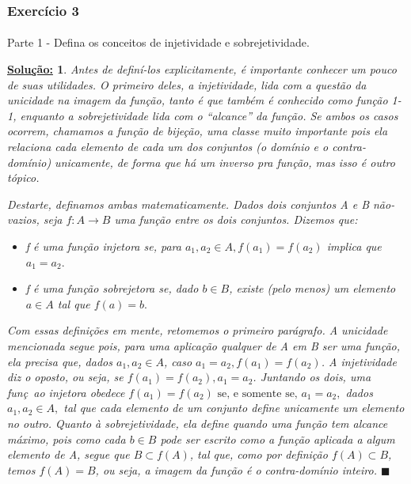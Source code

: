 \documentclass{article}
\newtheorem*{sol*}{\underline{Solu\c c\~ao:}}
\renewcommand\qedsymbol{$\blacksquare$}
\begin{document}
\subsubsection{Exerc\'icio 3}
\paragraph{}Parte 1  - Defina os conceitos de injetividade e sobrejetividade.
\begin{sol*}
	Antes de defin\'i-los explicitamente, \'e importante conhecer um pouco de suas utilidades. O primeiro deles, a injetividade, lida com a quest\~ao da unicidade na imagem da fun\c c\~ao, tanto \'e que tamb\'em \'e conhecido como fun\c c\~ao 1-1, enquanto a sobrejetividade lida com o ``alcance'' da fun\c c\~ao. Se ambos os casos ocorrem, chamamos a fun\c c\~ao de bije\c c\~ao, uma classe muito importante pois ela relaciona cada elemento de cada um dos conjuntos (o dom\'inio e o contra-dom\'inio) unicamente, de forma que h\'a um inverso pra fun\c c\~ao, mas isso \'e outro t\'opico.

	Destarte, definamos ambas matematicamente. Dados dois conjuntos A e B n\~ao-vazios, seja $f:A\rightarrow{B}$ uma fun\c c\~ao entre os dois conjuntos. Dizemos que:
	\begin{itemize}
		\item[a)] f \'e uma fun\c c\~ao injetora se, para $a_1, a_2\in{A}, f(a_1) = f(a_2)$ implica que $a_1 =  a_2.$
		\item[b)] f \'e uma fun\c c\~ao sobrejetora se, dado $b\in{B}$, existe (pelo menos) um elemento $a\in{A}$ tal que $f(a) = b.$
	\end{itemize}

	Com essas defini\c c\~oes em mente, retomemos o primeiro par\'agrafo. A unicidade mencionada segue pois, para uma aplica\c c\~ao qualquer de A em B ser uma fun\c c\~ao, ela precisa que, dados $a_1, a_2\in{A}$, caso $a_1 = a_2, f(a_1) = f(a_2)$. A injetividade diz o oposto, ou seja, se $f(a_1) = f(a_2), a_1 = a_2$. Juntando os dois, uma fun\c c~ao injetora obedece $f(a_1) = f(a_2) \text{ se, e somente se, } a_1 = a_2,$ dados $a_1, a_2\in{A},$ tal que cada elemento de um conjunto define unicamente um elemento no outro. Quanto \`a sobrejetividade, ela define quando uma fun\c c\~ao tem alcance m\'aximo, pois como cada $b\in{B}$ pode ser escrito como a fun\c c\~ao aplicada a algum elemento de A, segue que $B \subset f(A)$, tal que, como por defini\c c\~ao $f(A) \subset B$, temos $f(A) = B$, ou seja, a imagem da fun\c c\~ao \'e o contra-dom\'inio inteiro.
	\qedsymbol
\end{sol*}
\end{document}
